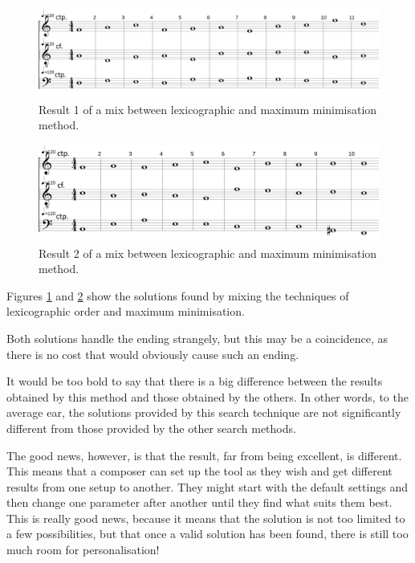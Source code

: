 \begin{figure}[h]
    \centering
    \includegraphics[width=1\textwidth]{Images/Experiments/min-1sp.png}
    \caption{Result 1 of a mix between lexicographic and maximum minimisation method.}
    \label{fig:min-sp}
\end{figure}
\begin{figure}[h]
    \centering
    \includegraphics[width=1\textwidth]{Images/Experiments/min-1sp0.png}
    \caption{Result 2 of a mix between lexicographic and maximum minimisation method.}
    \label{fig:min-sp0}
\end{figure}

Figures \ref{fig:min-sp} and \ref{fig:min-sp0} show the solutions found by mixing the techniques of lexicographic order and maximum minimisation.

Both solutions handle the ending strangely, but this may be a coincidence, as there is no cost that would obviously cause such an ending.

It would be too bold to say that there is a big difference between the results obtained by this method and those obtained by the others. In other words, to the average ear, the solutions provided by this search technique are not significantly different from those provided by the other search methods.


The good news, however, is that the result, far from being excellent, is different. This means that a composer can set up the tool as they wish and get different results from one setup to another. They might start with the default settings and then change one parameter after another until they find what suits them best. This is really good news, because it means that the solution is not too limited to a few possibilities, but that once a valid solution has been found, there is still too much room for personalisation!


